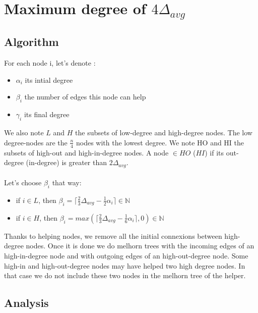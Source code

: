 \documentclass{article}
\begin{document}
\section{Maximum degree of $4\Delta_{avg}$}

\subsection{Algorithm}

For each node i, let's denote :
\begin{itemize}
    \item $\alpha_i$ its intial degree
    \item $\beta_i$ the number of edges this node can help
    \item $\gamma_i$ its final degree
\end{itemize}
We also note $L$ and $H$ the subsets of low-degree and high-degree nodes.
The low degree-nodes are the $\frac{n}{4}$ nodes with the lowest degree.
We note HO and HI the subsets of high-out and high-in-degree nodes.
A node $\in HO$ ($HI$) if its out-degree (in-degree) is greater than
$2\Delta_{avg}$.\\\\
Let's choose $\beta_i$ that way:
\begin{itemize}
  \item if $i \in L$, then
  $\beta_i = \lceil\frac{2}{3}\Delta_{avg}-\frac{1}{2}\alpha_i\rceil \in \mathbb{N}$
  \item if $i \in H$, then
  $\beta_i = max(\lceil\frac{2}{3}\Delta_{avg}-\frac{1}{6}\alpha_i\rceil, 0) \in \mathbb{N}$
\end{itemize}
Thanks to helping nodes, we remove all the initial connexions between high-degree nodes.
Once it is done we do melhorn trees with the incoming edges of an high-in-degree
node and with outgoing edges of an high-out-degree node.
Some high-in and high-out-degree nodes may have helped two high degree nodes.
In that case we do not include these two nodes in the melhorn tree of the helper.

\subsection{Analysis}
\end{document}
